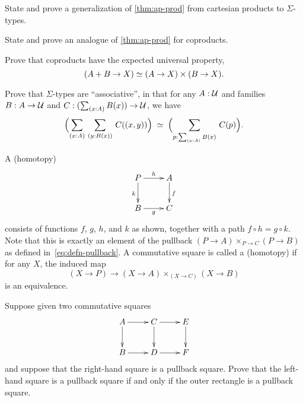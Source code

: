 \documentclass[hott-all.tex]{subfiles}
\begin{document}
\begin{ex}\label{ex:ap-sigma}
  State and prove a generalization of \cref{thm:ap-prod} from cartesian products to $\Sigma$-types.
\end{ex}
%
\begin{ex}\label{ex:ap-coprod}
  State and prove an analogue of \cref{thm:ap-prod} for coproducts.
\end{ex}
%

\begin{ex}\label{ex:coprod-ump}
  Prove that coproducts have the expected universal property,
  \[ (A+B \to X) \simeq (A\to X)\times (B\to X). \]
\end{ex}
%
\begin{ex}\label{ex:sigma-assoc}
  Prove that $\Sigma$-types are ``associative'',
  in that for any $A:\mathcal{U}$ and families $B:A\to\mathcal{U}$ and $C:(\sm{x:A} B(x))\to\UU$, we have
  \[\eqvspaced{\Parens{\sm{x:A}{y:B(x)} C(\pairr{x,y})}}{\Parens{\sm{p:\sm{x:A}B(x)} C(p)}}. \]
\end{ex}
%
\begin{ex}\label{ex:pullback}
  A (homotopy) 
  \begin{equation*}
  \vcenter{\xymatrix{
      P\ar[r]^h\ar[d]_k &
      A\ar[d]^f\\
      B\ar[r]_g &
      C
      }}
  \end{equation*}
  consists of functions $f$, $g$, $h$, and $k$ as shown, together with a path $f \circ h= g \circ k$.
  Note that this is exactly an element of the pullback $(P\to A) \times_{P\to C} (P\to B)$ as defined in~\eqref{eq:defn-pullback}.
  A commutative square is called a (homotopy) 
  if for any $X$, the induced map
  \[ (X\to P) \to (X\to A) \times_{(X\to C)} (X\to B) \]
  is an equivalence.
\end{ex}
%
\begin{ex}\label{ex:pullback-pasting}
  Suppose given two commutative squares
  \begin{equation*}
    \vcenter{\xymatrix{
        A\ar[r]\ar[d] &
        C\ar[r]\ar[d] &
        E\ar[d]\\
        B\ar[r] &
        D\ar[r] &
        F
      }}
  \end{equation*}
  and suppose that the right-hand square is a pullback square.
  Prove that the left-hand square is a pullback square if and only if the outer rectangle is a pullback square.
\end{ex}
\end{document}
